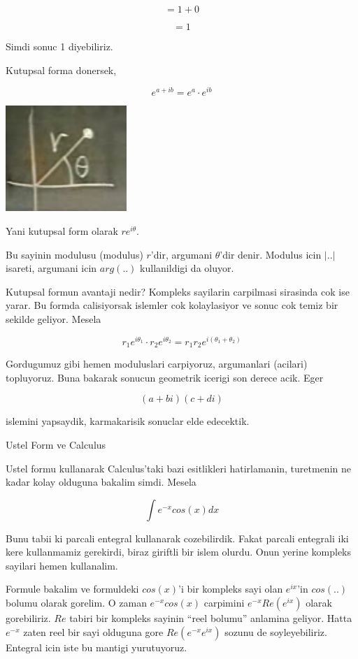 \documentclass[12pt,fleqn]{article}
\begin{document}
\[ = 1 +  0 \]

\[ = 1  \]

Simdi sonuc 1 diyebiliriz.

Kutupsal forma donersek, 

\[ e^{a+ib}  = e^a \cdot e^{ib}\]

\includegraphics[height=4cm]{6_4.png}

Yani kutupsal form olarak $re^{i\theta}$. 

Bu sayinin modulusu (modulus) $r$'dir, argumani $\theta$'dir denir. Modulus
icin $|..|$ isareti, argumani icin $arg(..)$ kullanildigi da oluyor. 

Kutupsal formun avantaji nedir? Kompleks sayilarin carpilmasi sirasinda cok
ise yarar. Bu formda calisiyorsak islemler cok kolaylasiyor ve sonuc cok
temiz bir sekilde geliyor. Mesela

\[ r_1 e^{i\theta_1} \cdot r_2 e^{i\theta_2} = r_1r_2 e^{i(\theta_1+\theta_2)}\]

Gordugumuz gibi hemen moduluslari carpiyoruz, argumanlari (acilari)
topluyoruz. Buna bakarak sonucun geometrik icerigi son derece acik. Eger 

\[ (a+bi)(c+di) \]

islemini yapsaydik, karmakarisik sonuclar elde edecektik.

Ustel Form ve Calculus

Ustel formu kullanarak Calculus'taki bazi esitlikleri hatirlamanin,
turetmenin ne kadar kolay olduguna bakalim simdi. Mesela

\[ \int e^{-x}cos(x) dx \]

Bunu tabii ki parcali entegral kullanarak cozebilirdik. Fakat parcali
entegrali iki kere kullanmamiz gerekirdi, biraz giriftli bir islem
olurdu. Onun yerine kompleks sayilari hemen kullanalim. 

Formule bakalim ve formuldeki $cos(x)$'i bir kompleks sayi olan $e^{ix}$'in
$cos(..)$ bolumu olarak gorelim. O zaman $e^{-x}cos(x)$ carpimini
$e^{-x}Re(e^{ix}) $ olarak gorebiliriz. $Re$ tabiri bir kompleks sayinin
``reel bolumu'' anlamina geliyor. Hatta $e^{-x}$ zaten reel bir sayi
olduguna gore $Re(e^{-x}e^{ix})$ sozunu de soyleyebiliriz. Entegral icin
iste bu mantigi yurutuyoruz.
\end{document}
